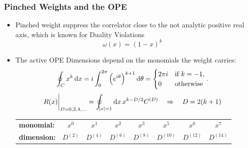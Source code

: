 \documentclass{beamer}
\begin{document}
\begin{frame}
  \frametitle{Pinched Weights and the OPE}
  \begin{itemize}
  \item Pinched weight suppress the correlator close to the not analytic
    positive real axis, which is known for Duality Violations
    \begin{equation}
      \omega(x) = \left( 1 - x \right)^k
    \end{equation}

    \vfill

    \item The active OPE Dimensions depend on the monomials the weight carries:
      \begin{equation}
        \oint_{C} x^k \dif x = i \int_0^{2\pi}\left(e^{i \theta}\right)^{k+1} \dif \theta
        = \begin{cases} \mbox{\(2 \pi i\)} & \mbox{if } k=-1, \\ \mbox{0} & \mbox{otherwise} \end{cases}.
      \end{equation}
      \begin{equation}
        R(x)\biggr\rvert_{D=0,2,4,\dots} = \oint_{\abs{x}=1} \dif x \, x^{k-D/2} C^{(D)} \quad \Rightarrow \quad D = 2 (k+1)
      \end{equation}
      \begin{tabular}{l|ccccccc}
        \toprule
        \textbf{monomial:} & \(x^0\) & \(x^1\) & \(x^2\) & \(x^3\) & \(x^5\) & \(x^6\) & \(x^7\)\\
        \textbf{dimension:} & \(D^{(2)}\) & \(D^{(4)}\) & \(D^{(6)}\) & \(D^{(8)}\) & \(D^{(10)}\) & \(D^{(12)}\) & \(D^{(14)}\)\\
        \bottomrule 
      \end{tabular}
  \end{itemize}
\end{frame}
\end{document}
